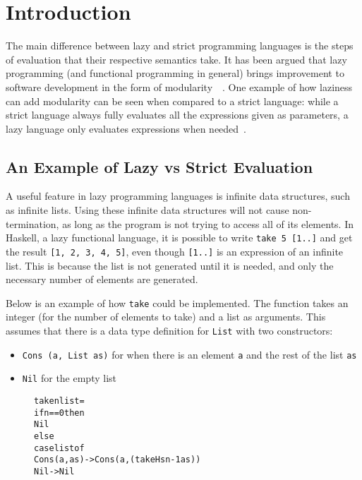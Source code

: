 \chapter{Introduction}
The main difference between lazy and strict programming languages is the steps
of evaluation that their respective semantics take.
It has been argued that lazy programming (and functional programming in general)
brings improvement to software development in the form of
modularity~\cite{Hu1989}~\cite{Hu2015}.
One example of how laziness can add modularity can be seen when compared to
a strict language: while a strict language always fully evaluates all the
expressions given as parameters, a lazy language only evaluates expressions
when needed~\cite{ThunkHas27:online}.


\section{An Example of Lazy vs Strict Evaluation}
\label{intro:Example}
A useful feature in lazy programming languages is
infinite data structures, such as infinite lists. Using
these infinite data structures will not cause non-termination, as long as the
program is not trying to access all of its elements. In Haskell, a lazy
functional language, it is possible to write \texttt{take 5 [1..]} and get the
result \texttt{[1, 2, 3, 4, 5]}, even though \texttt{[1..]} is
an expression of an infinite list. This is because the list is not generated
until it is needed, and only the necessary number of elements are generated.

Below is an example of how \texttt{take} could be implemented. The function
takes an integer (for the number of elements to take) and a list as arguments.
This assumes that there is a data type definition for \texttt{List} with two
constructors:
\begin{itemize}
  \item \texttt{Cons (a, List as)} for when there is an element \texttt{a} and the rest of the list \texttt{as}
  \item \texttt{Nil} for the empty list
\end{itemize}

\begin{figure}[H]
\begin{alltt}
take n list =
  if n == 0 then
    Nil
  else
    case list of
      Cons (a, as) -> Cons (a, (takeHs n-1 as))
      Nil          -> Nil
\end{alltt}
\end{figure}

